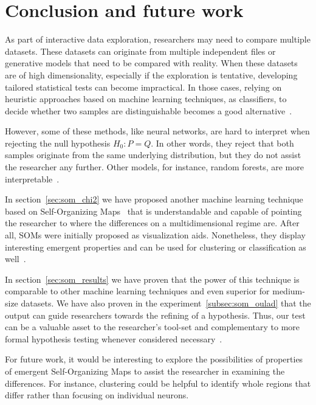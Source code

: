\section{Conclusion and future work}
\label{sec:som_conclusions}
As part of interactive data exploration, researchers may need to compare multiple datasets.
These datasets can originate from multiple independent files or generative models that need
to be compared with reality. When these datasets are of high dimensionality, especially if
the exploration is tentative, developing tailored statistical tests can become impractical.
In those cases, relying on heuristic approaches based on machine learning techniques, as
classifiers, to decide whether two samples are distinguishable becomes a good
alternative~\cite{friedman2004multivariate,kim2021classification}.

However, some of these methods, like neural networks, are hard to interpret when rejecting
the null hypothesis $H_0: P = Q$. In other words, they reject that both samples originate
from the same underlying distribution, but they do not assist the researcher any further.
Other models, for instance, random forests, are more  interpretable~\cite{friedman2004multivariate}.

In section~\ref{sec:som_chi2} we have proposed another machine learning technique based on
Self-Organizing Maps~\cite{kohonen1982self} that is understandable and capable of pointing
the researcher to where the differences on a multidimensional regime are. After all, SOMs
were initially proposed as visualization aids. Nonetheless, they display interesting emergent
properties and can be used for clustering or classification as well~\cite{ultsch2007emergence}.

In section~\ref{sec:som_results} we have proven that the power of this technique is comparable
to other machine learning techniques and even superior for medium-size datasets.
We have also proven in the experiment~\ref{subsec:som_oulad} that the output can guide
researchers towards the refining of a hypothesis. Thus, our test can be a valuable asset to
the researcher's tool-set and complementary to more formal hypothesis testing whenever
considered necessary~\cite{rosenblatt2021better}.

For future work, it would be interesting to explore the possibilities of properties of emergent
Self-Organizing Maps to assist the researcher in examining the differences.
For instance, clustering could be helpful to identify whole regions that differ rather than
focusing on individual neurons.
